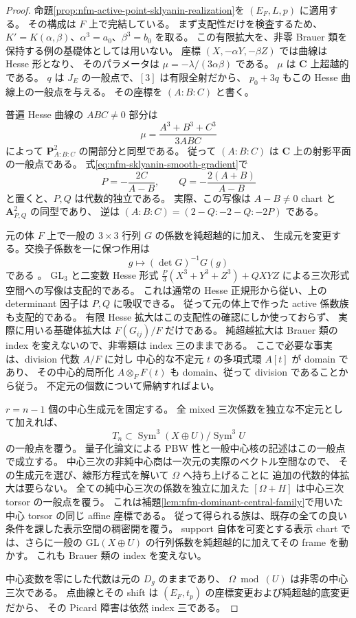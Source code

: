 \begin{proof}
命題\ref{prop:nfm-active-point-sklyanin-realization}を $(E_F,L,p)$ に適用する。
その構成は $F$ 上で完結している。
まず支配性だけを検査するため、
$K'=K(\alpha,\beta)$、$\alpha^3=a_0$、$\beta^3=b_0$ を取る。
この有限拡大を、非零 Brauer 類を保持する例の基礎体としては用いない。
座標 $(X,-\alpha Y,-\beta Z)$ では曲線は Hesse 形となり、
そのパラメータは $\mu=-\lambda/(3\alpha\beta)$ である。
$\mu$ は $\mathbf C$ 上超越的である。
$q$ は $J_E$ の一般点で、$[3]$ は有限全射だから、
$p_0+3q$ もこの Hesse 曲線上の一般点を与える。
その座標を $(A:B:C)$ と書く。

普遍 Hesse 曲線の $ABC\ne0$ 部分は
\[
 \mu=\frac{A^3+B^3+C^3}{3ABC}
\]
によって $\mathbf P^2_{A:B:C}$ の開部分と同型である。
従って $(A:B:C)$ は $\mathbf C$ 上の射影平面の一般点である。
式\eqref{eq:nfm-sklyanin-smooth-gradient}で
\[
 P=-\frac{2C}{A-B},\qquad Q=-\frac{2(A+B)}{A-B}
\]
と置くと、$P,Q$ は代数的独立である。
実際、この写像は $A-B\ne0$ chart と $\mathbf A^2_{P,Q}$ の同型であり、
逆は $(A:B:C)=(2-Q:-2-Q:-2P)$ である。

元の体 $F$ 上で一般の $3\times3$ 行列 $G$ の係数を純超越的に加え、
生成元を変更する。交換子係数を一に保つ作用は
\[
 g\longmapsto (\det G)^{-1}G(g)
\]
である \cite[Proposition~2.11]{MoriSmith}。
$\mathrm{GL}_3$ と二変数 Hesse 形式
$\frac P3(X^3+Y^3+Z^3)+QXYZ$ による三次形式空間への写像は支配的である。
これは通常の Hesse 正規形から従い、上の determinant 因子は $P,Q$ に吸収できる。
従って元の体上で作った active 係数族も支配的である。
有限 Hesse 拡大はこの支配性の確認にしか使っておらず、
実際に用いる基礎体拡大は $F(G_{ij})/F$ だけである。
純超越拡大は Brauer 類の index を変えないので、非零類は index 三のままである。
ここで必要な事実は、division 代数 $A/F$ に対し
中心的な不定元 $t$ の多項式環 $A[t]$ が domain であり、
その中心的局所化 $A\otimes_F F(t)$ も domain、従って division であることから従う。
不定元の個数について帰納すればよい。

$r=n-1$ 個の中心生成元を固定する。
全 mixed 三次係数を独立な不定元として加えれば、
\[
 T_n\subset\operatorname{Sym}^3(X\oplus U)/\operatorname{Sym}^3U
\]
の一般点を覆う。
量子化論文\cite{CubicQuantization}による PBW 性と一般中心核の記述はこの一般点で成立する。
中心三次の非純中心商は一次元の実際のベクトル空間なので、
その生成元を選び、線形方程式を解いて $\Omega$ へ持ち上げることに
追加の代数的体拡大は要らない。
全ての純中心三次の係数を独立に加えた
$[\Omega+H]$ は中心三次 torsor の一般点を覆う。
これは補題\ref{lem:nfm-dominant-central-family}で用いた
中心 torsor の同じ affine 座標である。
従って得られる族は、既存の全ての良い条件を課した表示空間の稠密開を覆う。
support 自体を可変とする表示 chart では、さらに一般の
$\mathrm{GL}(X\oplus U)$ の行列係数を純超越的に加えてその frame を動かす。
これも Brauer 類の index を変えない。

中心変数を零にした代数は元の $D_g$ のままであり、
$\Omega\bmod(U)$ は非零の中心三次である。
点曲線とその shift は $(E_F,t_p)$ の座標変更および純超越的底変更だから、
その Picard 障害は依然 index 三である。
\end{proof}

